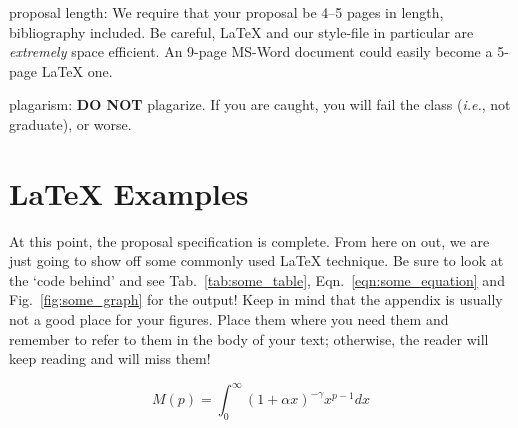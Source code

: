 \documentclass{sig-alternate}
\begin{document}
\begin{enumerate*}
\item {\sc proposal length}: We require that your proposal be 4--5
  pages in length, bibliography included. Be careful, \LaTeX{} and our
  style-file in particular are \textit{extremely} space efficient. An
  9-page MS-Word document could easily become a 5-page \LaTeX{}
  one.\vspace{5pt}

\item {\sc plagarism}: \textbf{DO NOT} plagarize. If you are caught,
  you will fail the class (\textit{i.e.}, not graduate), or worse.

\end{enumerate*}

\section{\LaTeX{} Examples}
\label{app:latex_examples}

At this point, the proposal specification is complete. From here on
out, we are just going to show off some commonly used \LaTeX{}
technique. Be sure to look at the `code behind' and see
Tab.~\ref{tab:some_table}, Eqn.~\ref{eqn:some_equation} and
Fig.~\ref{fig:some_graph} for the output! Keep in mind that the
appendix is usually not a good place for your figures. Place them
where you need them and remember to refer to them in the body of your
text; otherwise, the reader will keep reading and will miss them!

\begin{equation}
M(p) = \int^\infty_0 (1+\alpha x)^{-\gamma}x^{p-1}dx
\label{eqn:some_equation}
\end{equation}
\end{document}
